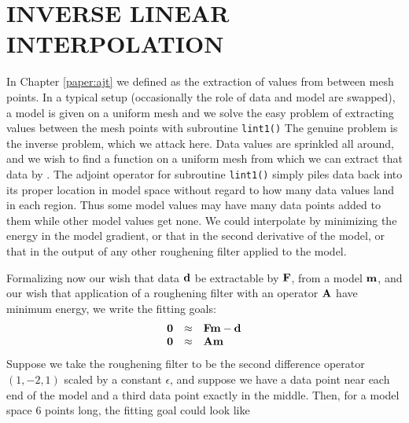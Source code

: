 \section{INVERSE LINEAR INTERPOLATION}
In Chapter \ref{paper:ajt} we defined 
as the extraction of values from between mesh points.
In a typical setup (occasionally the role of data and model are swapped),
a model is given on a uniform mesh
and we solve the easy problem of extracting values
between the mesh points with subroutine \texttt{lint1()} %
The genuine problem is the inverse problem, which we attack here.
Data values are sprinkled all around,
and we wish to find a function on a uniform mesh
from which we can extract that data by .
The adjoint operator for subroutine {\tt lint1()}
simply piles data back into its proper location in model space
without regard to how many data values land in each region.
Thus some model values may have many data points added
to them while other model values get none.
We could interpolate by minimizing the energy in the model gradient,
or that in the second derivative of the model,
or that in the output of any other roughening filter
applied to the model.
\par
Formalizing now our wish
that data $\bold d$ be extractable by  $\bold F$,
from a model $\bold m$,
and our wish that application of a roughening filter
with an operator $\bold A$ have minimum energy, we write the fitting goals:
\begin{equation}
        \begin{array}{lll}
        \bold 0 &\approx & \bold F \bold m - \bold d \\
        \bold 0 &\approx & \bold A \bold m
        \label{eqn:invintwish}
        \end{array}
\end{equation}
Suppose we take the roughening filter to be the second difference operator
$(1,-2,1)$
scaled by a constant $\epsilon$,
and suppose we have a data point near each end of the model
and a third data point exactly in the middle.
Then,
for a model space 6 points long,
the fitting goal could look like
\def\E{\epsilon}
